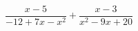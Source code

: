 \begin{ex}[type=expression]
	\begin{condition}
		\(\dfrac{x-5}{-12+7x-x^2}+\dfrac{x-3}{x^2-9x+20}\)
	\end{condition}
\end{ex}